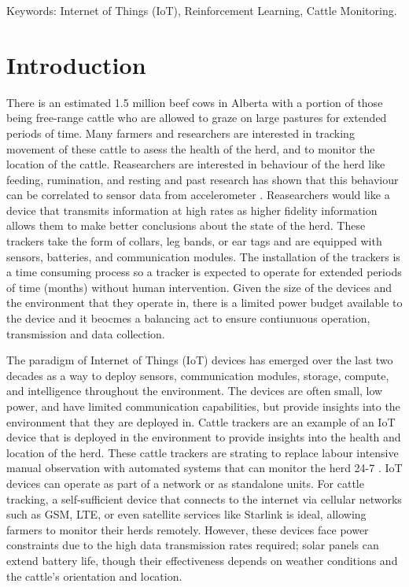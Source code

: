 \documentclass[10pt]{cai}
\begin{document}
\begin{keywords}{Keywords:}
Internet of Things (IoT), Reinforcement Learning, Cattle Monitoring.
\end{keywords}
\copyrightnotice

\section{Introduction}

There is an estimated 1.5 million beef cows in Alberta with a portion of those being free-range cattle who are allowed to graze on large pastures for extended periods of time.
Many farmers and researchers are interested in tracking movement of these cattle to asess the health of the herd, and to monitor the location of the cattle.
Reasearchers are interested in behaviour of the herd like feeding, rumination, and resting and past research has shown that this behaviour can be correlated to sensor data from accelerometer \cite{unoldIoTBasedCowHealth2020}.
Reasearchers would like a device that transmits information at high rates as higher fidelity information allows them to make better conclusions about the state of the herd.
These trackers take the form of collars, leg bands, or ear tags and are equipped with sensors, batteries, and communication modules.
The installation of the trackers is a time consuming process so a tracker is expected to operate for extended periods of time (months) without human intervention.
Given the size of the devices and the environment that they operate in, there is a limited power budget available to the device and it beocmes a balancing act to ensure contiunuous operation, transmission and data collection.

The paradigm of Internet of Things (IoT) devices has emerged over the last two decades as a way to deploy sensors, communication modules, storage, compute, and intelligence throughout the environment.
The devices are often small, low power, and have limited communication capabilities, but provide insights into the environment that they are deployed in.
Cattle trackers are an example of an IoT device that is deployed in the environment to provide insights into the health and location of the herd.
These cattle trackers are strating to replace labour intensive manual observation with automated systems that can monitor the herd 24-7 \cite{unoldIoTBasedCowHealth2020} \cite{moutaouakilDigitalFarmingSurvey2023}.
IoT devices can operate as part of a network or as standalone units. 
For cattle tracking, a self-sufficient device that connects to the internet via cellular networks such as GSM, LTE, or even satellite services like Starlink is ideal, allowing farmers to monitor their herds remotely. 
However, these devices face power constraints due to the high data transmission rates required; solar panels can extend battery life, though their effectiveness depends on weather conditions and the cattle's orientation and location.
\end{document}
